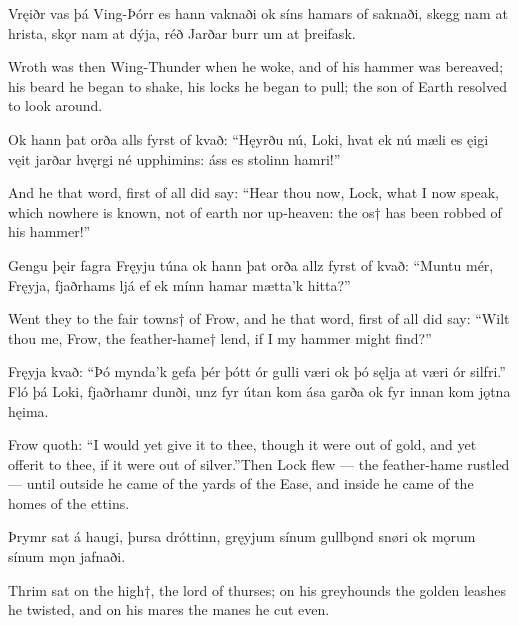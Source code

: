 Vręiðr vas þá Ving-Þórr \hld es hann vaknaði
ok síns hamars \hld of saknaði,
skegg nam at hrista, \hld skǫr nam at dýja,
réð Jarðar burr \hld um at þreifask.

Wroth was then Wing-Thunder when he woke, and of his hammer was bereaved; his beard he began to shake, his locks he began to pull; the son of Earth resolved to look around.

Ok hann þat orða \hld alls fyrst of kvað:
“Hęyrðu nú, Loki, \hld hvat ek nú mæli
es ęigi vęit \hld jarðar hvęrgi
né upphimins: \hld áss es stolinn hamri!”

And he that word, first of all did say: “Hear thou now, Lock, what I now speak, which nowhere is known, not of earth nor up-heaven: the os† has been robbed of his hammer!”

Gengu þęir fagra \hld Fręyju túna
ok hann þat orða \hld allz fyrst of kvað:
“Muntu mér, Fręyja, \hld fjaðrhams ljá
ef ek mínn hamar \hld mætta’k hitta?”

Went they to the fair towns† of Frow, and he that word, first of all did say: “Wilt thou me, Frow, the feather-hame† lend, if I my hammer might find?”

Fręyja kvað:
“Þó mynda’k gefa þér \hld þótt ór gulli væri
ok þó sęlja \hld at væri ór silfri.”
Fló þá Loki, \hld fjaðrhamr dunði,
unz fyr útan kom \hld ása garða
ok fyr innan kom \hld jǫtna hęima. 

Frow quoth:
“I would yet give it to thee, though it were out of gold, and yet offer\footnotemark[1] it to thee, if it were out of silver.”\footnotemark[2] Then Lock flew — the feather-hame rustled — until outside he came of the yards of the Ease, and inside he came of the homes of the ettins.\footnotemark[3]

Þrymr sat á haugi, \hld þursa dróttinn,
gręyjum sínum \hld gullbǫnd snøri
ok mǫrum sínum \hld mǫn jafnaði. 

Thrim sat on the high†, the lord of thurses; on his greyhounds the golden leashes he twisted, and on his mares the manes he cut even.

